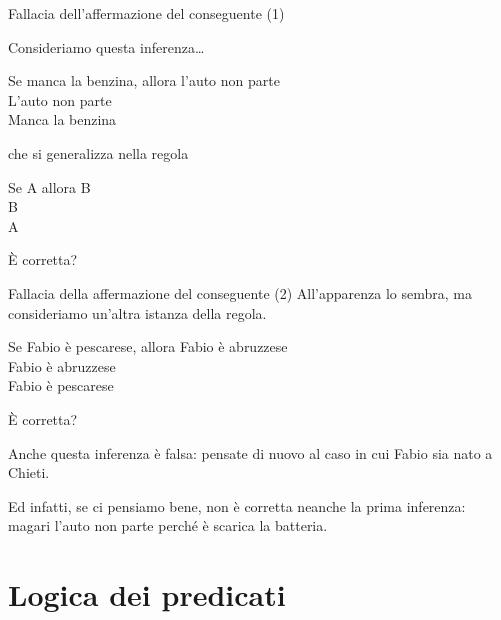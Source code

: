 \documentclass[aspectratio=169,10pt,dvipsnames,handout]{beamer}
\begin{document}
\begin{frame}{Fallacia dell'affermazione del conseguente (1)}

	Consideriamo questa inferenza\ldots
	\begin{center}
		\begin{inference}
			Se manca la benzina, allora l'auto non parte\\
			L'auto non parte\\
			\hline
			Manca la benzina
		\end{inference}
	\end{center}
	che si generalizza nella regola
	\begin{center}
		\begin{inference}
			Se A allora B\\
			B\\
			\hline
			A
		\end{inference}
	\end{center}
	È corretta?
\end{frame}

\begin{frame}{Fallacia della affermazione del conseguente (2)}
	All'apparenza lo sembra, ma consideriamo un'altra istanza della regola.
	\begin{center}
		\begin{inference}
			Se Fabio è pescarese, allora Fabio è abruzzese\\
			Fabio è abruzzese\\
			\hline
			Fabio è pescarese
		\end{inference}
	\end{center}
	È corretta?

	\pause
	\medskip
	Anche questa inferenza è falsa: pensate di nuovo al caso in cui Fabio sia nato a Chieti.

	\medskip
	Ed infatti, se ci pensiamo bene, non è corretta neanche la prima inferenza: magari l'auto non parte perché è scarica la batteria.
\end{frame}


\section{Logica dei predicati}

\end{document}
